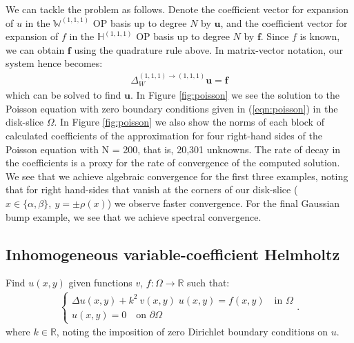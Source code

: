 \documentclass[11pt, oneside]{article}   	%
\newcommand{\R}{\mathbb{R}}
\newcommand{\hdop}{H}
\newcommand{\bighdopiii}{{\mathbb{\hdop}^{(1,1,1)}}}
\newcommand{\laplacewiii}{\Delta_W^{(1,1,1)\to(1,1,1)}}
\newcommand{\bigWiii}{{\mathbb{W}^{(1,1,1)}}}
\begin{document}
We can tackle the problem as follows. Denote the coefficient vector for expansion of $u$ in the $\bigWiii$ OP basis up to degree $N$ by $\mathbf{u}$, and the coefficient vector for expansion of $f$ in the $\bighdopiii$ OP basis up to degree $N$ by $\mathbf{f}$. Since $f$ is known, we can obtain $\mathbf{f}$ using the quadrature rule above. In matrix-vector notation, our system hence becomes:
\begin{align*}
    \laplacewiii \mathbf{u} = \mathbf{f}
\end{align*}
which can be solved to find $\mathbf{u}$.
In Figure \ref{fig:poisson} we see the solution to the Poisson equation with zero boundary conditions given in (\ref{eqn:poisson}) in the disk-slice $\Omega$. In Figure \ref{fig:poisson} we also show the norms of each block of calculated coefficients of the approximation for four right-hand sides of the Poisson equation with N = 200, that is, 20,301 unknowns. The rate of decay in the coefficients is a proxy for the rate of convergence of the computed solution. We see that we achieve algebraic convergence for the first three examples, noting that for right hand-sides that vanish at the corners of our disk-slice ($x\in\{\alpha,\beta\}, \: y = \pm \rho(x)$) we observe faster convergence. For the final Gaussian bump example, we see that we achieve spectral convergence.

\subsection{Inhomogeneous variable-coefficient Helmholtz}

Find \(u(x,y)\) given functions $v$, $f : \Omega \to \R$ such that:
\begin{align}
	\begin{cases}
    		\Delta u(x,y) + k^2 \: v(x,y) \; u(x,y) = f(x,y) \quad \text{in } \Omega \\
		u(x,y) = 0 \quad \text{on } \partial \Omega
	\end{cases}.
	\label{eqn:helmholtz}
\end{align}
where $k \in \R$, noting the imposition of zero Dirichlet boundary conditions on $u$.
\end{document}
